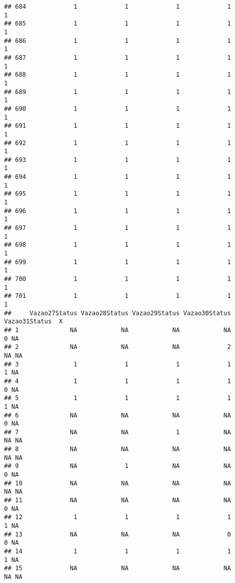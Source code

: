\documentclass[
]{article}
\begin{document}
\begin{verbatim}
## 684             1             1             1             1             1
## 685             1             1             1             1             1
## 686             1             1             1             1             1
## 687             1             1             1             1             1
## 688             1             1             1             1             1
## 689             1             1             1             1             1
## 690             1             1             1             1             1
## 691             1             1             1             1             1
## 692             1             1             1             1             1
## 693             1             1             1             1             1
## 694             1             1             1             1             1
## 695             1             1             1             1             1
## 696             1             1             1             1             1
## 697             1             1             1             1             1
## 698             1             1             1             1             1
## 699             1             1             1             1             1
## 700             1             1             1             1             1
## 701             1             1             1             1             1
##     Vazao27Status Vazao28Status Vazao29Status Vazao30Status Vazao31Status  X
## 1              NA            NA            NA            NA             0 NA
## 2              NA            NA            NA             2            NA NA
## 3               1             1             1             1             1 NA
## 4               1             1             1             1             0 NA
## 5               1             1             1             1             1 NA
## 6              NA            NA            NA            NA             0 NA
## 7              NA            NA             1            NA            NA NA
## 8              NA            NA            NA            NA            NA NA
## 9              NA             1            NA            NA             0 NA
## 10             NA            NA            NA            NA            NA NA
## 11             NA            NA            NA            NA             0 NA
## 12              1             1             1             1             1 NA
## 13             NA            NA            NA             0             0 NA
## 14              1             1             1             1             1 NA
## 15             NA            NA            NA            NA            NA NA

\end{verbatim}
\end{document}
